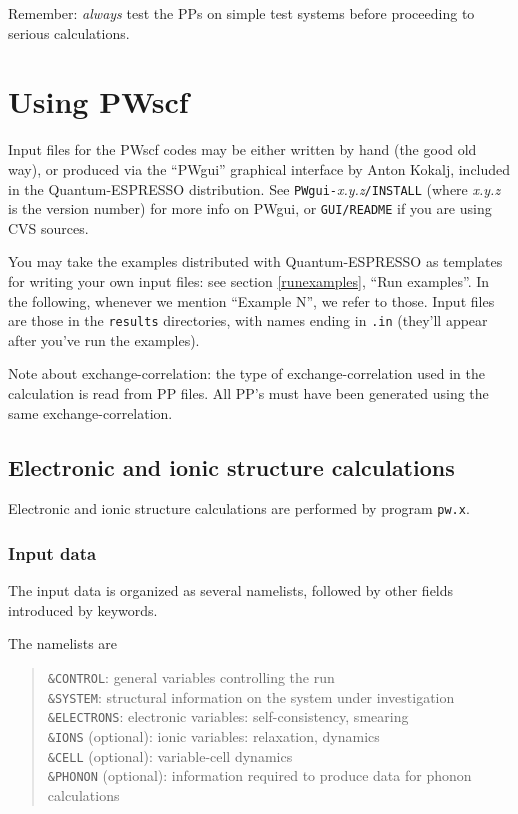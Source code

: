 \documentclass[12pt,a4paper]{article}
\begin{document}
Remember: \emph{always} test the PPs on simple test systems before
proceeding to serious calculations.

\clearpage

\section{Using PWscf}

Input files for the PWscf codes may be either written by hand (the
good old way), or produced via the ``PWgui'' graphical interface
by Anton Kokalj, included in the Quantum-ESPRESSO distribution.
See \texttt{PWgui-}\emph{x.y.z}\texttt{/INSTALL} (where \emph{x.y.z}
is the version number) for more info on PWgui, or \texttt{GUI/README}
if you are using CVS sources.

You may take the examples distributed with Quantum-ESPRESSO as templates for
writing your own input files: see section \ref{runexamples}, ``Run
examples''.  In the following, whenever we mention ``Example N'', we
refer to those.
Input files are those in the \texttt{results} directories, with names
ending in \texttt{.in} (they'll appear after you've run the examples).

Note about exchange-correlation: the type of exchange-correlation used
in the calculation is read from PP files.
All PP's must have been generated using the same exchange-correlation. 

\subsection{Electronic and ionic structure calculations}

Electronic and ionic structure calculations are performed by program
\texttt{pw.x}.

\subsubsection{Input data}

The input data is organized as several namelists, followed by other
fields introduced by keywords.

The namelists are 
\begin{quote}
  \texttt{\&CONTROL}: general variables controlling the run\\
  \texttt{\&SYSTEM}: structural information on the system under
    investigation\\
  \texttt{\&ELECTRONS}: electronic variables: self-consistency,
    smearing\\
  \texttt{\&IONS} (optional): ionic variables: relaxation,
    dynamics\\
  \texttt{\&CELL} (optional): variable-cell dynamics\\
  \texttt{\&PHONON} (optional): information required to produce
    data for phonon calculations
\end{quote}
\end{document}
